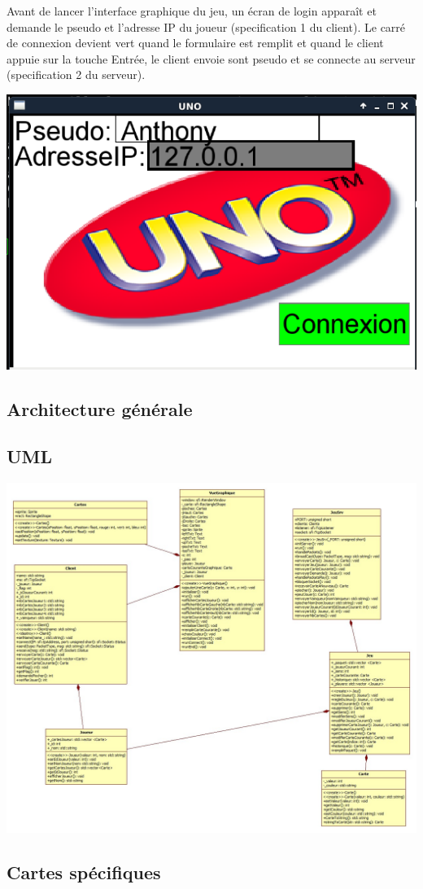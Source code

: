 \documentclass[french]{article}
\begin{document}
Avant de lancer l'interface graphique du jeu, un écran de login apparaît et demande le pseudo et l'adresse IP du joueur (specification 1 du client). Le carré de connexion devient vert quand le formulaire est remplit et quand le client appuie sur la touche Entrée, le client envoie sont pseudo et se connecte au serveur (specification 2 du serveur).
\begin{center}
	\centering
	\includegraphics[width=0.7\linewidth]{login}
\end{center}

\subsection{Architecture générale}
\subsection{UML}
\begin{center}
	\centering
	\includegraphics[width=0.7\linewidth]{uml}
\end{center}


\subsection{Cartes spécifiques}
\end{document}
